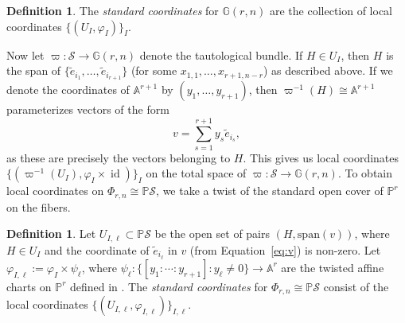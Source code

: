 \documentclass[12pt]{amsart}
\numberwithin{equation}{section}
\theoremstyle{plain}
\theoremstyle{definition}
\newtheorem{defn}[thm]{Definition}
\newcommand{\mb}[1]{\mathbb{#1}}
\newcommand{\mc}[1]{\mathcal{#1}}
\newcommand{\mr}[1]{\mathrm{#1}}
\newcommand{\vphi}{\varphi}
\newcommand{\id}{\operatorname{id}}
\begin{document}
\begin{defn}
    The \emph{standard coordinates} for $\mb{G}(r,n)$ are the collection of local coordinates $\{(U_I,\vphi_I)\}_I$.
\end{defn}

Now let $\varpi\colon \mc{S}\to\mb{G}(r,n)$ denote the tautological bundle. If $H\in U_I$, then $H$ is the span of $\{\tilde{e}_{i_1},\ldots,\tilde{e}_{i_{r+1}}\}$ (for some $x_{1,1},\ldots,x_{r+1,n-r}$) as described above. If we denote the coordinates of $\mb{A}^{r+1}$ by $(y_1,\ldots,y_{r+1})$, then $\varpi^{-1}(H)\cong\mb{A}^{r+1}$ parameterizes vectors of the form
\begin{equation}\label{eq:v}
v=\sum_{s=1}^{r+1}y_s\tilde{e}_{i_s},
\end{equation}
as these are precisely the vectors belonging to $H$. This gives us local coordinates $\{(\varpi^{-1}(U_I),\vphi_I\times\id)\}_I$ on the total space of $\varpi\colon \mc{S}\to\mb{G}(r,n)$. To obtain local coordinates on $\Phi_{r,n}\cong\mb{P}\mc{S}$, we take a twist of the standard open cover of $\mb{P}^r$ on the fibers.

\begin{defn}\label{def:coordinates on Phi}
    Let $U_{I,\ell}\subset\mb{P}\mc{S}$ be the open set of pairs $(H,\mr{span}(v))$, where $H\in U_I$ and the coordinate of $\tilde{e}_{i_\ell}$ in $v$ (from Equation~\ref{eq:v}) is non-zero. Let $\vphi_{I,\ell}:=\vphi_I\times\psi_\ell$, where $\psi_\ell:\{[y_1:\cdots:y_{r+1}]:y_\ell\neq 0\}\to\mb{A}^r$ are the twisted affine charts on $\mb{P}^r$ defined in \cite[p.~638]{MR4211099}. The \emph{standard coordinates} for $\Phi_{r,n}\cong\mb{P}\mc{S}$ consist of the local coordinates $\{(U_{I,\ell},\vphi_{I,\ell})\}_{I,\ell}$.
\end{defn}
\end{document}
